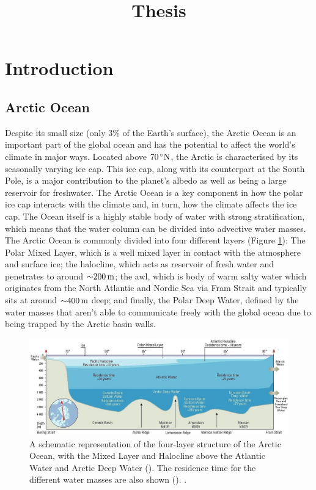 \documentclass[10pt,a4paper]{article}
\title{Thesis}
\begin{document}
\maketitle


\section{Introduction}

\subsection{Arctic Ocean}


Despite its small size (only $3\%$ of the Earth's surface), the Arctic
Ocean is an important part of the global ocean and has the potential
to affect the world's climate in major ways. Located above
$70\,^{\circ}{\rm N}$, the Arctic is characterised by its seasonally
varying ice cap. This ice cap, along with its counterpart at the South
Pole, is a major contribution to the planet's albedo as well as being
a large reservoir for freshwater. The Arctic Ocean is a key component
in how the polar ice cap interacts with the climate and, in turn, how
the climate affects the ice cap. 
The Ocean itself is a highly stable body of water with strong stratification, 
which means that the water column can be divided into advective water masses.
The Arctic Ocean is commonly divided into four different layers (Figure \ref{fig:amap}):
The Polar Mixed Layer, which is a well mixed layer in
contact with the atmosphere and surface ice; the halocline, which acts as
reservoir of fresh water and penetrates to around ${\sim}200\,{\rm m}$; the \gls{awl},
which is body of warm salty water which originates from the North Atlantic and Nordic 
Sea via Fram Strait and typically sits at around ${\sim}400\,{\rm m}$ deep; and finally, 
the Polar Deep Water, defined by the water masses that aren't
able to communicate freely with the global ocean due to being trapped by the Arctic basin walls.



\begin{figure}
	\centering
	\includegraphics[width=\linewidth]{amap}
	\caption[\cite{wilson1998amap}]{  A schematic representation of the four-layer structure of the Arctic Ocean, with the Mixed Layer and Halocline
		above the Atlantic Water and Arctic Deep Water (\cite{aagaard1989role}). 
		The residence time for the different water masses are also shown (\cite{bonisch1995deep}). \cite{wilson1998amap}.}
	\label{fig:amap}
\end{figure}
\end{document}
